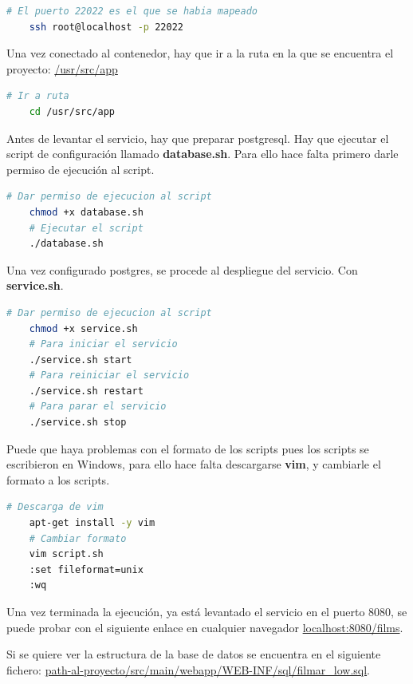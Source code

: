 \begin{lstlisting}[language=bash, caption=Conexión ssh]
    # El puerto 22022 es el que se habia mapeado
    ssh root@localhost -p 22022
\end{lstlisting}

Una vez conectado al contenedor, hay que ir a la ruta en la que se encuentra el proyecto: \url{/usr/src/app}

\begin{lstlisting}[language=bash, caption=Ir a la ruta del proyecto]
    # Ir a ruta
    cd /usr/src/app
\end{lstlisting}

Antes de levantar el servicio, hay que preparar postgresql. 
Hay que ejecutar el script de configuración llamado \textbf{database.sh}. Para ello hace falta primero darle permiso de ejecución al 
script.

\begin{lstlisting}[language=bash, caption=Configuración postgresql]
    # Dar permiso de ejecucion al script
    chmod +x database.sh
    # Ejecutar el script
    ./database.sh
\end{lstlisting}

Una vez configurado postgres, se procede al despliegue del servicio. Con \textbf{service.sh}.

\begin{lstlisting}[language=bash, caption=Despliegue]
    # Dar permiso de ejecucion al script
    chmod +x service.sh
    # Para iniciar el servicio
    ./service.sh start
    # Para reiniciar el servicio
    ./service.sh restart
    # Para parar el servicio
    ./service.sh stop
\end{lstlisting}

Puede que haya problemas con el formato 
de los scripts pues los scripts se escribieron en Windows, 
para ello hace falta descargarse \textbf{vim}, y cambiarle el formato a los scripts.

\begin{lstlisting}[language=bash, caption=Ayudas]
    # Descarga de vim
    apt-get install -y vim
    # Cambiar formato
    vim script.sh
    :set fileformat=unix
    :wq
\end{lstlisting}

Una vez terminada la ejecución, ya está levantado el servicio en el puerto 8080, 
se puede probar con el siguiente enlace en cualquier navegador
\url{localhost:8080/films}.

Si se quiere ver la estructura de la base de datos se encuentra en 
el siguiente fichero: \url{path-al-proyecto/src/main/webapp/WEB-INF/sql/filmar_low.sql}.

